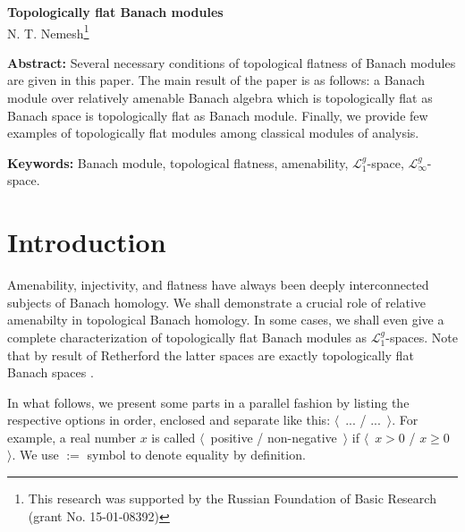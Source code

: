 \documentclass[12pt]{article}
\begin{document}
\begin{center}
\Large \textbf{Topologically flat Banach modules}\\[0.5cm]
\small {N. T. Nemesh}\footnote{This research was supported by the Russian Foundation of Basic Research (grant No. 15-01-08392)}\\[0.5cm]
\end{center}

\thispagestyle{empty}

\medskip
\textbf{Abstract:} Several necessary conditions of topological flatness of Banach modules are given in this paper. The main result of the paper is as follows: a Banach module over relatively amenable Banach algebra which is topologically flat as Banach space is topologically flat as Banach module. Finally, we provide few examples of topologically flat modules among classical modules of analysis.

\medskip
\textbf{Keywords:} Banach module, topological flatness, amenability, $\mathcal{L}_1^g$-space, $\mathcal{L}_\infty^g$-space.

\bigskip


\section{Introduction}
\label{SectionIntroduction}

Amenability, injectivity, and flatness have always been deeply interconnected subjects of Banach homology. We shall demonstrate a crucial role of relative amenabilty in topological Banach homology. In some cases, we shall even give a complete characterization of topologically flat Banach modules as $\mathcal{L}_1^g$-spaces. Note that by result of Retherford the latter spaces are exactly topologically flat Banach spaces \cite{StegRethNucOpL1LInfSp}.

In what follows, we present some parts in a parallel fashion by listing the respective options in order, enclosed and separate like this: $\langle$~... / ...~$\rangle$. For example, a real number $x$ is called $\langle$~positive / non-negative~$\rangle$ if $\langle$~$x>0$ / $x\geq 0$~$\rangle$. We use $:=$ symbol to denote equality by definition.
\end{document}
